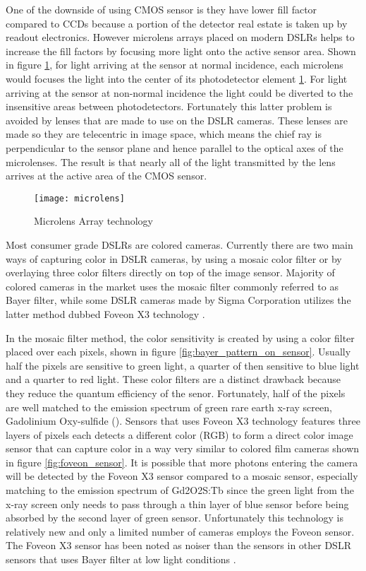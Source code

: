 One of the downside of using CMOS sensor is they have lower fill factor compared to CCDs because a portion of the detector real estate is taken up by readout electronics.  However microlens arrays placed on modern DSLRs helps to increase the fill factors by focusing more light onto the active sensor area.  Shown in figure \ref{fig:microlensarray}, for light arriving at the sensor at normal incidence, each microlens would focuses the light into the center of its photodetector element \ref{fig:microlensarray}.  For light arriving at the sensor at non-normal incidence the light could be diverted to the insensitive areas between photodetectors.  Fortunately this latter problem is avoided by lenses that are made to use on the DSLR cameras.  These lenses are made so they are telecentric in image space, which means the chief ray is perpendicular to the sensor plane and hence parallel to the optical axes of the microlenses.  The result is that nearly all of the light transmitted by the lens arrives at the active area of the CMOS sensor.

\begin{figure}
\centering
\texttt{[image: microlens]}
\caption{Microlens Array technology}
\label{fig:microlensarray}
\end{figure}

Most consumer grade DSLRs are colored cameras.  Currently there are two main ways of capturing color in DSLR cameras, by using a mosaic color filter or by overlaying three color filters directly on top of the image sensor.  Majority of colored cameras in the market uses the mosaic filter commonly referred to as Bayer filter, while some DSLR cameras made by Sigma Corporation utilizes the latter method dubbed Foveon X3 technology \cite{foveon}.  

In the mosaic filter method, the color sensitivity is created by using a color filter placed over each pixels, shown in figure \ref{fig:bayer_pattern_on_sensor}.  Usually half the pixels are sensitive to green light, a quarter of then sensitive to blue light and a quarter to red light.  These color filters are a distinct drawback because they reduce the quantum efficiency of the senor.  Fortunately, half of the pixels are well matched to the emission spectrum of green rare earth x-ray screen, Gadolinium Oxy-sulfide ().  Sensors that uses Foveon X3 technology features three layers of pixels each detects a different color (RGB) to form a direct color image sensor that can capture color in a way very similar to colored film cameras shown in figure \ref{fig:foveon_sensor}.  It is possible that more photons entering the camera will be detected by the Foveon X3 sensor compared to a mosaic sensor, especially matching to the emission spectrum of Gd2O2S:Tb since the green light from the x-ray screen only needs to pass through a thin layer of blue sensor before being absorbed by the second layer of green sensor.  Unfortunately this technology is relatively new and only a limited number of cameras employs the Foveon sensor.  The Foveon X3 sensor has been noted as noiser than the sensors in other DSLR sensors that uses Bayer filter at low light conditions \cite{sigmasd10} \cite{stevesdigicams}.

